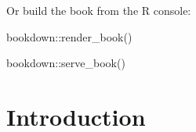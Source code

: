 \documentclass[
]{book}
\newenvironment{Shaded}{\begin{snugshade}}{\end{snugshade}}
\newcommand{\FunctionTok}[1]{\textcolor[rgb]{0.00,0.00,0.00}{#1}}
\newcommand{\NormalTok}[1]{#1}
\newcommand{\SpecialCharTok}[1]{\textcolor[rgb]{0.00,0.00,0.00}{#1}}
\begin{document}
Or build the book from the R console:

\begin{Shaded}
\begin{Highlighting}[]
\NormalTok{bookdown}\SpecialCharTok{::}\FunctionTok{render\_book}\NormalTok{()}
\end{Highlighting}
\end{Shaded}

\begin{Shaded}
\begin{Highlighting}[]
\NormalTok{bookdown}\SpecialCharTok{::}\FunctionTok{serve\_book}\NormalTok{()}
\end{Highlighting}
\end{Shaded}

\hypertarget{introduction}{%
\chapter{Introduction}\label{introduction}}
\end{document}
